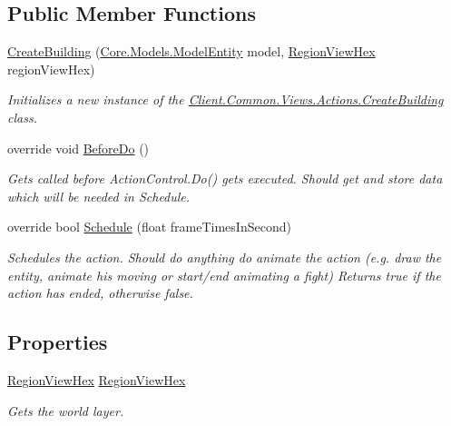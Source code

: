 \subsection*{Public Member Functions}
\begin{DoxyCompactItemize}
\item 
\hyperlink{classClient_1_1Common_1_1Views_1_1Actions_1_1CreateBuilding_a2f4fe0e79bc911291d5b69f0754efc3a}{Create\+Building} (\hyperlink{classCore_1_1Models_1_1ModelEntity}{Core.\+Models.\+Model\+Entity} model, \hyperlink{classClient_1_1Common_1_1Views_1_1RegionViewHex}{Region\+View\+Hex} region\+View\+Hex)
\begin{DoxyCompactList}\small\item\em Initializes a new instance of the \hyperlink{classClient_1_1Common_1_1Views_1_1Actions_1_1CreateBuilding}{Client.\+Common.\+Views.\+Actions.\+Create\+Building} class. \end{DoxyCompactList}\item 
override void \hyperlink{classClient_1_1Common_1_1Views_1_1Actions_1_1CreateBuilding_ac4ae114e1751a82e521cb3dfbc346e49}{Before\+Do} ()
\begin{DoxyCompactList}\small\item\em Gets called before Action\+Control.\+Do() gets executed. Should get and store data which will be needed in Schedule. \end{DoxyCompactList}\item 
override bool \hyperlink{classClient_1_1Common_1_1Views_1_1Actions_1_1CreateBuilding_a9124e0ed7b33ef3b674613b9dbda626f}{Schedule} (float frame\+Times\+In\+Second)
\begin{DoxyCompactList}\small\item\em Schedules the action. Should do anything do animate the action (e.\+g. draw the entity, animate his moving or start/end animating a fight) Returns true if the action has ended, otherwise false. \end{DoxyCompactList}\end{DoxyCompactItemize}
\subsection*{Properties}
\begin{DoxyCompactItemize}
\item 
\hyperlink{classClient_1_1Common_1_1Views_1_1RegionViewHex}{Region\+View\+Hex} \hyperlink{classClient_1_1Common_1_1Views_1_1Actions_1_1CreateBuilding_ab73f911ae98f56d040a6eb03e50f451f}{Region\+View\+Hex}
\begin{DoxyCompactList}\small\item\em Gets the world layer. \end{DoxyCompactList}\end{DoxyCompactItemize}
